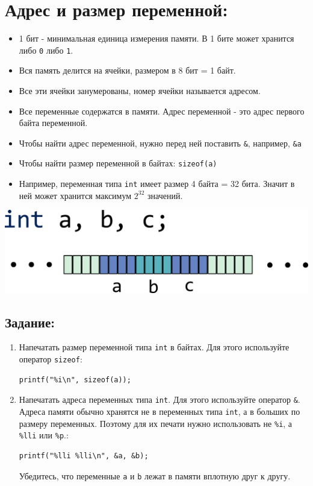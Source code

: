\documentclass{article}
\begin{document}
\section*{Адрес и размер переменной:}
\begin{itemize}
\item 1 бит - минимальная единица измерения памяти. В 1 бите может хранится либо \texttt{0} либо \texttt{1}.
\item Вся память делится на ячейки, размером в 8 бит = 1 байт.
\item Все эти ячейки занумерованы, номер ячейки называется адресом.
\item Все переменные содержатся в памяти. Адрес переменной - это адрес первого байта переменной.
\item Чтобы найти адрес переменной, нужно перед ней поставить \texttt{\&}, например, \texttt{\&a}
\item Чтобы найти размер переменной в байтах: \texttt{sizeof(a)}
\item Например, переменная типа \texttt{int} имеет размер 4 байта = 32 бита. Значит в ней может хранится максимум $2^{32}$ значений.
\end{itemize}

\begin{center}
\includegraphics[scale=0.8]{../images/memory_ints.png}
\end{center}

\subsection*{Задание:}
\begin{enumerate}
\item Напечатать размер переменной типа \texttt{int} в байтах. Для этого используйте оператор \texttt{sizeof}:
\begin{lstlisting}
printf("%i\n", sizeof(a));
\end{lstlisting}
\item Напечатать адреса переменных типа \texttt{int}. Для этого используйте оператор \texttt{\&}. Адреса памяти обычно хранятся не в переменных типа \texttt{int}, а в больших по размеру переменных. Поэтому для их печати нужно использовать не \texttt{\%i}, а \texttt{\%lli} или \texttt{\%p}.:
\begin{lstlisting}
printf("%lli %lli\n", &a, &b);
\end{lstlisting}
Убедитесь, что переменные \texttt{a} и \texttt{b} лежат в памяти вплотную друг к другу.
\end{enumerate}
\end{document}
